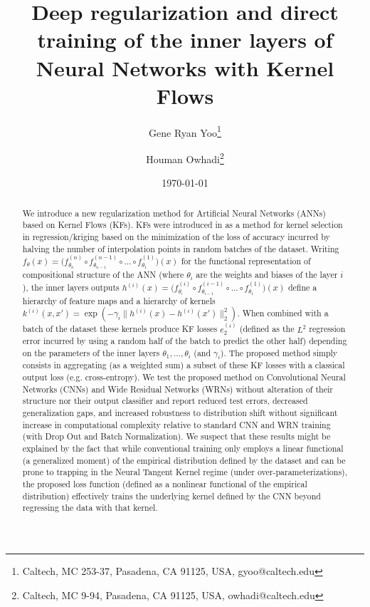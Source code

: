 \documentclass[11pt]{article}
\begin{document}
\title{ Deep regularization and direct training of the inner layers
of  Neural Networks with Kernel Flows}

\date{\today}



\author{Gene Ryan Yoo\thanks{Caltech, MC 253-37, Pasadena, CA 91125, USA, gyoo@caltech.edu} \and Houman Owhadi\thanks{Caltech,  MC 9-94, Pasadena, CA 91125, USA, owhadi@caltech.edu}}


\maketitle

\begin{abstract}
We introduce a new regularization method for Artificial Neural Networks (ANNs) based on Kernel Flows (KFs). KFs were introduced in \cite{owhadi2019kernel} as a method for kernel selection in regression/kriging based on the minimization of the loss of accuracy incurred by halving the number of interpolation points in random batches of the dataset.
 Writing   $f_\theta(x) = \big(f^{(n)}_{\theta_n}\circ f^{(n-1)}_{\theta_{n-1}} \circ \dots \circ f^{(1)}_{\theta_1}\big)(x)$ for the functional representation of compositional structure of the ANN (where $\theta_i$ are the weights and biases of the layer $i$), the inner layers outputs $h^{(i)}(x) = \big(f^{(i)}_{\theta_i}\circ f^{(i-1)}_{\theta_{i-1}} \circ \dots \circ f^{(1)}_{\theta_1}\big)(x)$ define a hierarchy of feature maps and a hierarchy of kernels $k^{(i)}(x,x')=\exp(- \gamma_i \|h^{(i)}(x)-h^{(i)}(x')\|_2^2)$.
When combined with a batch of the dataset these kernels produce KF losses $e_2^{(i)}$ (defined as the $L^2$ regression error incurred by
using a random half of the batch to predict the other half) depending on the parameters of the inner layers $\theta_1,\ldots,\theta_i$ (and $\gamma_i$).
The proposed method simply consists in aggregating (as a weighted sum) a subset of these KF losses with a classical output loss (e.g. cross-entropy).
We test the proposed method on Convolutional Neural Networks (CNNs) and Wide Residual Networks (WRNs) without alteration of their structure nor their output classifier and  report reduced test errors, decreased generalization gaps, and increased robustness to distribution shift without significant increase in computational complexity relative to standard  CNN and WRN training (with Drop Out and Batch Normalization).
We suspect that these results might be explained by the fact that while conventional training only employs a linear functional (a generalized moment) of the empirical distribution defined by the dataset and can be prone to trapping in the Neural Tangent Kernel regime (under over-parameterizations), the proposed loss function  (defined as a nonlinear functional of the empirical distribution) effectively trains the underlying kernel defined by the CNN beyond regressing the data with that kernel.





\end{abstract}
\end{document}
